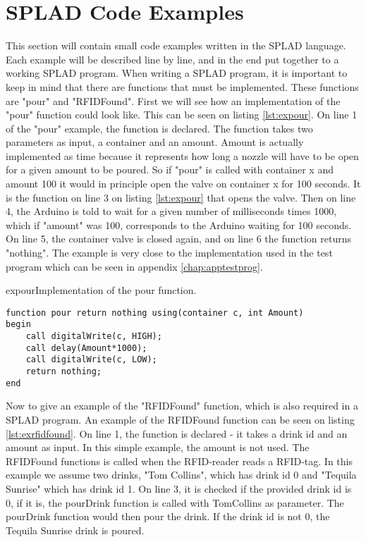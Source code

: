 \section{SPLAD Code Examples}
This section will contain small code examples written in the SPLAD language. Each example will be described line by line, and in the end put together to a working SPLAD program.
When writing a SPLAD program, it is important to keep in mind that there are functions that must be implemented. These functions are "pour" and "RFIDFound". First we will see how an implementation of the "pour" function could look like. This can be seen on listing \ref{lst:expour}. On line 1 of the "pour" example, the function is declared. The function takes two parameters as input, a container and an amount. Amount is actually implemented as time because it represents how long a nozzle will have to be open for a given amount to be poured. So if "pour" is called with container x and amount 100 it would in principle open the valve on container x for 100 seconds. It is the function on line 3 on listing \ref{lst:expour} that opens the valve. Then on line 4, the Arduino is told to wait for a given number of milliseconds times 1000, which if "amount" was 100, corresponds to the Arduino waiting for 100 seconds. On line 5, the container valve is closed again, and on line 6 the function returns "nothing". The example is very close to the implementation used in the test program which can be seen in appendix \ref{chap:apptestprog}.

\begin{code}{expour}{Implementation of the pour function.}
\begin{lstlisting}
function pour return nothing using(container c, int Amount)
begin
	call digitalWrite(c, HIGH);
	call delay(Amount*1000);
	call digitalWrite(c, LOW);
	return nothing;
end
\end{lstlisting}
\end{code}

Now to give an example of the "RFIDFound" function, which is also required in a SPLAD program. An example of the RFIDFound function can be seen on listing \ref{lst:exrfidfound}. On line 1, the function is declared - it takes a drink id and an amount as input. In this simple example, the amount is not used. The RFIDFound functions is called when the RFID-reader reads a RFID-tag. In this example we assume two drinks, "Tom Collins", which has drink id 0 and "Tequila Sunrise" which has drink id 1. On line 3, it is checked if the provided drink id is 0, if it is, the pourDrink function is called with TomCollins as parameter. The pourDrink function would then pour the drink. If the drink id is not 0, the Tequila Sunrise drink is poured.   


